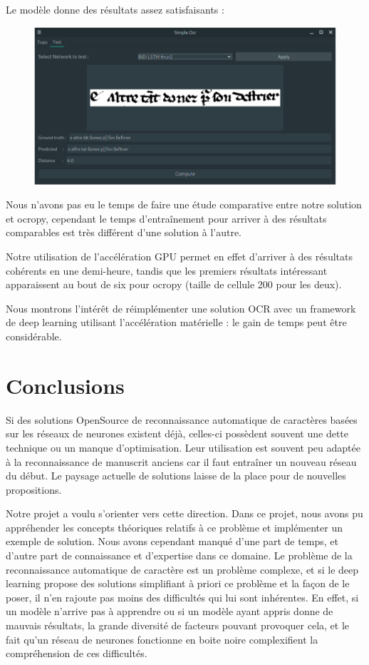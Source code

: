 \documentclass{report}
\begin{document}
Le modèle donne des résultats assez satisfaisants :

\begin{figure}[!htb]
	\begin{center}
		\includegraphics[width=0.7\linewidth]{img/screenshot-gui.png}
	\end{center}
\end{figure}

Nous n'avons pas eu le temps de faire une étude comparative entre notre solution et ocropy, cependant le temps d'entraînement pour arriver à des résultats comparables est très différent d'une solution à l'autre.

Notre utilisation de l'accélération GPU permet en effet d'arriver à des résultats cohérents en une demi-heure, tandis que les premiers résultats intéressant apparaissent au bout de six pour ocropy (taille de cellule 200 pour les deux).

Nous montrons l'intérêt de réimplémenter une solution OCR avec un framework de deep learning utilisant l'accélération matérielle : le gain de temps peut être considérable.

\chapter*{Conclusions}

Si des solutions OpenSource de reconnaissance automatique de caractères basées sur les réseaux de neurones existent déjà, celles-ci possèdent souvent une dette technique ou un manque d'optimisation.
Leur utilisation est souvent peu adaptée à la reconnaissance de manuscrit anciens car il faut entraîner un nouveau réseau du début.
Le paysage actuelle de solutions laisse de la place pour de nouvelles propositions.

Notre projet a voulu s'orienter vers cette direction.
Dans ce projet, nous avons pu appréhender les concepts théoriques relatifs à ce problème et implémenter un exemple de solution.
Nous avons cependant manqué d'une part de temps, et d'autre part de connaissance et d'expertise dans ce domaine.
Le problème de la reconnaissance automatique de caractère est un problème complexe, et si le deep learning propose des solutions simplifiant à priori ce problème et la façon de le poser, il n'en rajoute pas moins des difficultés qui lui sont inhérentes.
En effet, si un modèle n'arrive pas à apprendre ou si un modèle ayant appris donne de mauvais résultats, la grande diversité de facteurs pouvant provoquer cela, et le fait qu'un réseau de neurones fonctionne en boite noire complexifient la compréhension de ces difficultés.
\end{document}
